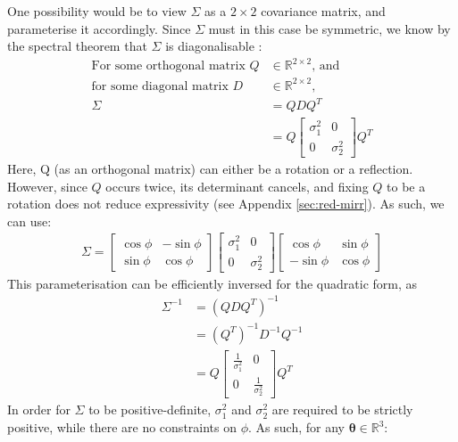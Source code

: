 \documentclass[a4paper, 12pt]{report}
\begin{document}
One possibility would be to view $\Sigma$ as a $2\times2$ covariance matrix, and parameterise it accordingly. Since $\Sigma$ must in this case be symmetric, we know by the spectral theorem that $\Sigma$ is diagonalisable \cite{poole2015linear}:
\begin{align}
\textrm{For some orthogonal matrix }Q &\in \mathbb{R}^{2\times 2} \textrm{, and} \nonumber \\
\textrm{for some diagonal matrix }D &\in \mathbb{R}^{2\times 2} \textrm{,}\nonumber \\
\Sigma &= QDQ^T\\
&= Q \begin{bmatrix}
	 \sigma_1^2 & 0\\ 0 &  \sigma_2^2
\end{bmatrix} Q^T
\end{align}
Here, Q (as an orthogonal matrix) can either be a rotation  or a reflection. However, since $Q$ occurs twice, its determinant cancels, and fixing $Q$ to be a rotation does not reduce expressivity (see Appendix \ref{sec:red-mirr}). As such, we can use:
\begin{align}
\Sigma = \begin{bmatrix}
	\cos \phi & -\sin \phi \\ \sin\phi & \cos\phi
\end{bmatrix}\begin{bmatrix}
	 \sigma_1^2 & 0\\ 0 &  \sigma_2^2
\end{bmatrix} \begin{bmatrix}
	\cos \phi & \sin \phi \\ -\sin\phi & \cos\phi
\end{bmatrix}
\end{align}
This parameterisation can be efficiently inversed for the quadratic form, as \begin{align}
	\Sigma^{-1} &= (QDQ^T)^{-1}\\
	&= (Q^T)^{-1} D^{-1} Q^{-1}\\
	&= Q\begin{bmatrix}
	 \frac{1}{\sigma_1^2} & 0\\ 0 &  \frac{1}{\sigma_2^2}
\end{bmatrix}Q^T
\end{align}
In order for $\Sigma$ to be positive-definite, $\sigma_1^2$ and $\sigma_2^2$ are required to be strictly positive, while there are no constraints on $\phi$. As such, for any $\boldsymbol{\theta}\in\mathbb{R}^3$:
\end{document}
